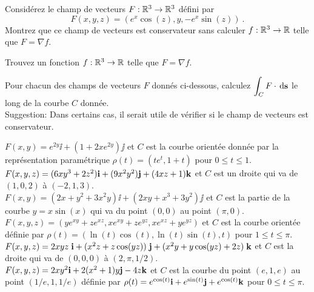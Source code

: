 \begin{question}
Considérez le champ de vecteurs $F:\mathbb{R}^3 \to \mathbb{R}^3$ défini par
\[
  F(x,y,z) = \left( e^x\cos(z), y, -e^x \sin(z) \right) \ .
\]
 Montrez que ce champ de vecteurs est conservateur sans
calculer $f:\mathbb{R}^3 \to \mathbb{R}$ telle que $F = \nabla f$.

 Trouvez un fonction $f:\mathbb{R}^3 \to \mathbb{R}$ telle que $F = \nabla f$.
\label{17Q6}
\end{question}

\begin{question}
Pour chacun des champs de vecteurs $F$ donnés ci-dessous,
calculez $\displaystyle \int_C F \cdot \,\mathrm{d}\mathbf{s}$ le long de
la courbe $C$ donnée.\\
Suggestion: Dans certains cas, il serait utile de vérifier si le champ
de vecteurs est conservateur.

 $F(x,y) = e^{2y}\ii + (1 + 2x e^{2y})\jj$ et $C$ est la
courbe orientée donnée par la représentation paramétrique
$\rho(t) = (te^t, 1 + t)$ pour $0 \leq t \leq 1$.\\
 $F(x,y,z) = (6xy^3 + 2 z^2)\mathbf{i} + (9x^2 y^2)\mathbf{j} + (4xz + 1)\mathbf{k}$
et $C$ est un droite qui va de $(1,0,2)$ à $(-2,1,3)$.\\
 $F(x,y) = (2x+y^2+3x^2y)\ii + (2xy + x^3 +3y^2)\jj$ et
$C$ est la partie de la courbe $y=x\sin(x)$ qui va du point $(0,0)$ au
point $(\pi,0)$.\\
 $F(x,y,z) = \left(y e^{xy} + z e^{xz}, x e^{xy} +z
  e^{yz}, x e^{xz} +y e^{yz} \right)$ et $C$ est la courbe orientée
définie par $\rho(t) = (\ln(t) \cos(t), \ln(t)\sin(t), t)$ pour
$1\leq t \leq \pi$.\\
 $F(x,y,z) = 2xyz\; \mathbf{i} + (x^2z + z\cos(yz))\;\mathbf{j}
+ (x^2y + y \cos(yz) + 2z)\;\mathbf{k}$ et $C$ est la droite qui va de
$(0,0,0)$ à $(2,\pi,1/2)$. \\
 $F(x,y,z) = 2xy^2\mathbf{i} + 2(x^2+1)y\mathbf{j} -4z\mathbf{k}$ et
$C$ est la courbe du point $(e,1,e)$ au point $(1/e,1,1/e)$ définie
par $\rho(t)=e^{\cos(t)}\mathbf{i} + e^{\sin(t)}\mathbf{j} + e^{\cos(t)}\mathbf{k}$
pour $0 \leq t \leq \pi$.
\label{17Q7}
\end{question}

